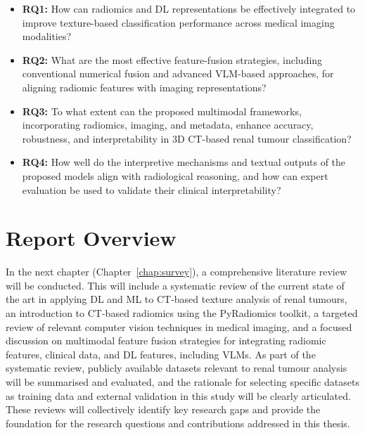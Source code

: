 \documentclass[final,british,a4paper,12pt]{phdthesis}
\begin{document}
        
        
\begin{itemize}

    \item \textbf{RQ1:} How can radiomics and DL representations be effectively integrated to improve texture-based classification performance across medical imaging modalities?

    \item \textbf{RQ2:} What are the most effective feature-fusion strategies, including conventional numerical fusion and advanced VLM-based approaches, for aligning radiomic features with imaging representations?

    \item \textbf{RQ3:} To what extent can the proposed multimodal frameworks, incorporating radiomics, imaging, and metadata, enhance accuracy, robustness, and interpretability in 3D CT-based renal tumour classification?

    \item \textbf{RQ4:} How well do the interpretive mechanisms and textual outputs of the proposed models align with radiological reasoning, and how can expert evaluation be used to validate their clinical interpretability?

\end{itemize}




\section{Report Overview}
In the next chapter (Chapter~\ref{chap:survey}), a comprehensive literature review will be conducted. This will include a systematic review of the current state of the art in applying DL and ML to CT-based texture analysis of renal tumours, an introduction to CT-based radiomics using the PyRadiomics toolkit, a targeted review of relevant computer vision techniques in medical imaging, and a focused discussion on multimodal feature fusion strategies for integrating radiomic features, clinical data, and DL features, including VLMs. As part of the systematic review, publicly available datasets relevant to renal tumour analysis will be summarised and evaluated, and the rationale for selecting specific datasets as training data and external validation in this study will be clearly articulated. These reviews will collectively identify key research gaps and provide the foundation for the research questions and contributions addressed in this thesis. 
        
\end{document}
